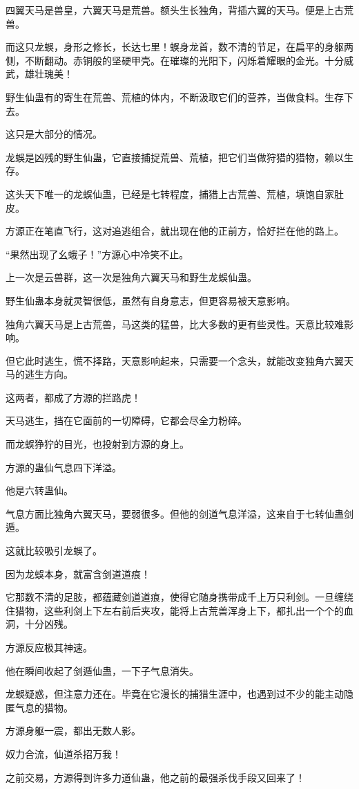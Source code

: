 \begin{this_body}
四翼天马是兽皇，六翼天马是荒兽。额头生长独角，背插六翼的天马。便是上古荒兽。

而这只龙蜈，身形之修长，长达七里！蜈身龙首，数不清的节足，在扁平的身躯两侧，不断翻动。赤铜般的坚硬甲壳。在璀璨的光阳下，闪烁着耀眼的金光。十分威武，雄壮瑰美！

野生仙蛊有的寄生在荒兽、荒植的体内，不断汲取它们的营养，当做食料。生存下去。

这只是大部分的情况。

龙蜈是凶残的野生仙蛊，它直接捕捉荒兽、荒植，把它们当做狩猎的猎物，赖以生存。

这头天下唯一的龙蜈仙蛊，已经是七转程度，捕猎上古荒兽、荒植，填饱自家肚皮。

方源正在笔直飞行，这对追逃组合，就出现在他的正前方，恰好拦在他的路上。

“果然出现了幺蛾子！”方源心中冷笑不止。

上一次是云兽群，这一次是独角六翼天马和野生龙蜈仙蛊。

野生仙蛊本身就灵智很低，虽然有自身意志，但更容易被天意影响。

独角六翼天马是上古荒兽，马这类的猛兽，比大多数的更有些灵性。天意比较难影响。

但它此时逃生，慌不择路，天意影响起来，只需要一个念头，就能改变独角六翼天马的逃生方向。

这两者，都成了方源的拦路虎！

天马逃生，挡在它面前的一切障碍，它都会尽全力粉碎。

而龙蜈狰狞的目光，也投射到方源的身上。

方源的蛊仙气息四下洋溢。

他是六转蛊仙。

气息方面比独角六翼天马，要弱很多。但他的剑道气息洋溢，这来自于七转仙蛊剑遁。

这就比较吸引龙蜈了。

因为龙蜈本身，就富含剑道道痕！

它那数不清的足肢，都蕴藏剑道道痕，使得它随身携带成千上万只利剑。一旦缠绕住猎物，这些利剑上下左右前后夹攻，能将上古荒兽浑身上下，都扎出一个个的血洞，十分凶残。

方源反应极其神速。

他在瞬间收起了剑遁仙蛊，一下子气息消失。

龙蜈疑惑，但注意力还在。毕竟在它漫长的捕猎生涯中，也遇到过不少的能主动隐匿气息的猎物。

方源身躯一震，都出无数人影。

奴力合流，仙道杀招万我！

之前交易，方源得到许多力道仙蛊，他之前的最强杀伐手段又回来了！


\end{this_body}
